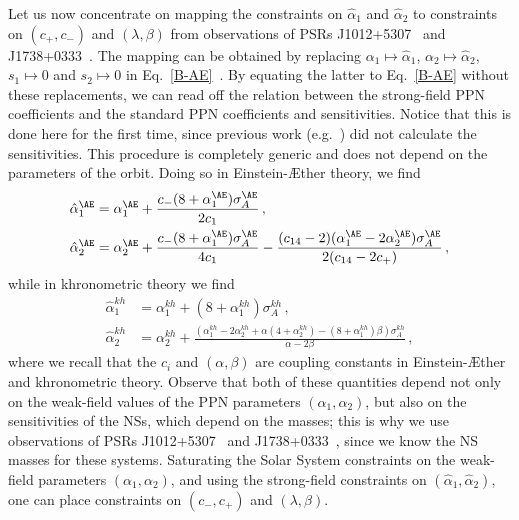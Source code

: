 \documentclass[prd,aps,twocolumn,nofootinbib,showpacs,superscriptaddress]{revtex4-1}
\def\kh{{kh}}
\begin{document}
Let us now concentrate on mapping the constraints on $\hat{\alpha}_{1}$ and $\hat{\alpha}_{2}$ to constraints on $(c_{+},c_{-})$ and $(\lambda,\beta)$ from observations of PSRs J1012+5307~\cite{Tauris:1994id} and J1738+0333~\cite{freire}. The mapping can be obtained by replacing $\alpha_{1} \mapsto \hat{\alpha}_{1}$, $\alpha_{2} \mapsto \hat{\alpha}_{2}$, $s_{1} \mapsto 0$ and $s_{2} \mapsto 0$ in Eq.~\eqref{B-AE}~\cite{damour_esposito_farese,Damour:1992ah}. By equating the latter to Eq.~\eqref{B-AE} without these replacements, we can read off the relation between the strong-field PPN coefficients and the standard PPN coefficients and sensitivities. Notice that this is done here for the first time, since previous work (e.g.~\cite{Bell:1995jz,Damour:1992ah,Shao:2012eg,Shao:2013wga}) did not calculate the sensitivities. This procedure is completely generic and does not depend on the parameters of the orbit. Doing so in Einstein-\AE ther theory, we find
\begin{align}
\label{SF-alpha1}
\hat{\alpha}_{1}^{\AE} &= \alpha_1^{\AE} + \frac{c_{-} (8+\alpha_1^{\AE}) \sigma_A^{\AE}}{2 c_1}\,,
\\ 
\label{SF-alpha2}
\hat{\alpha}_{2}^{\AE} &= \alpha_2^{\AE} + \frac{c_{-} (8 + \alpha_1^{\AE} ) \sigma_A^{\AE}}{4 c_{1}} - \frac{  (c_{14} -2)  (\alpha_1^{\AE} - 2 \alpha_2^{\AE}) \sigma_A^{\AE}}{2  (c_{14} - 2 c_{+})}\,, 
\end{align}
%
while in khronometric theory we find
%
\begin{align}
\label{SF-alpha1-HL}
\hat{\alpha}_{1}^{\kh} &= \alpha_1^{\kh} + (8 + \alpha_1^{\kh}) \sigma_A^{\kh}\,,
\\
\label{SF-alpha2-HL}
\hat{\alpha}_{2}^{\kh} &= \alpha_2^{\kh} + \frac{(\alpha_1^{\kh} -  2 \alpha_2^{\kh} + \alpha (4 + \alpha_2^{\kh} ) - (8 + \alpha_1^{\kh} ) \beta ) \sigma_A^{\kh} } {\alpha - 2 \beta}\,,
\end{align}
%
where we recall that the $c_{i}$ and $(\alpha, \beta)$ are coupling constants in Einstein-\AE ther and khronometric theory.  Observe that both of these quantities depend not only on the weak-field values of the PPN parameters $(\alpha_{1},\alpha_{2})$, but also on the sensitivities of the NSs, which depend on the masses; this is why we use observations of PSRs J1012+5307~\cite{Tauris:1994id} and J1738+0333~\cite{freire}, since we know the NS masses for these systems. Saturating the Solar System constraints on the weak-field parameters $(\alpha_{1},\alpha_{2})$, and using the strong-field constraints on $(\hat{\alpha}_{1},\hat{\alpha}_{2})$, one can place constraints on $(c_{-},c_{+})$ and $(\lambda,\beta)$. 
\end{document}
